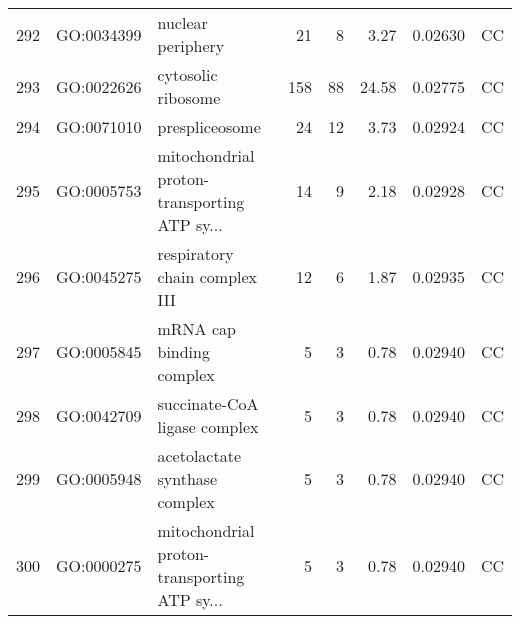\documentclass[12pt,oneside,a4paper]{article}
\begin{document}
\begin{longtable}{rllrrrll}
  292 & GO:0034399 & nuclear periphery &  21 &   8 & 3.27 & 0.02630 & CC \\ 
  293 & GO:0022626 & cytosolic ribosome & 158 &  88 & 24.58 & 0.02775 & CC \\ 
  294 & GO:0071010 & prespliceosome &  24 &  12 & 3.73 & 0.02924 & CC \\ 
  295 & GO:0005753 & mitochondrial proton-transporting ATP sy... &  14 &   9 & 2.18 & 0.02928 & CC \\ 
  296 & GO:0045275 & respiratory chain complex III &  12 &   6 & 1.87 & 0.02935 & CC \\ 
  297 & GO:0005845 & mRNA cap binding complex &   5 &   3 & 0.78 & 0.02940 & CC \\ 
  298 & GO:0042709 & succinate-CoA ligase complex &   5 &   3 & 0.78 & 0.02940 & CC \\ 
  299 & GO:0005948 & acetolactate synthase complex &   5 &   3 & 0.78 & 0.02940 & CC \\ 
  300 & GO:0000275 & mitochondrial proton-transporting ATP sy... &   5 &   3 & 0.78 & 0.02940 & CC \\ 
  \hline
\end{longtable}
\end{document}
